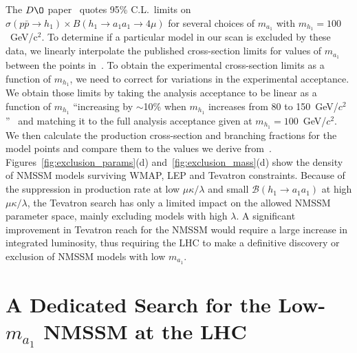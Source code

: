 \documentclass[aps,prl,twocolumn,nofootinbib,superscriptaddress]{revtex4}
\begin{document}
The $D\O$ paper~\cite{d0-low-ma} quotes 95\% C.L.\ limits on
$\sigma(p\bar{p} \to h_1) \times B(h_1 \to a_1 a_1 \to 4\mu)$ for
several choices of $m_{a_1}$ with $m_{h_1} = 100$~GeV/c$^2$.  To
determine if a particular model in our scan is excluded by these data,
we linearly interpolate the published cross-section limits for values
of $m_{a_1}$ between the points in~\cite{d0-low-ma}.  To obtain the
experimental cross-section limits as a function of $m_{h_1}$, we need
to correct for variations in the experimental acceptance.  We obtain
those limits by taking the analysis acceptance to be linear as a
function of $m_{h_1}$ ``increasing by $\sim$10\% when $m_{h_1}$
increases from 80 to 150~GeV/$c^2$''~\cite{d0-low-ma} and matching it
to the full analysis acceptance given at $m_{h_1} = 100$~GeV/$c^2$.
We then calculate the production cross-section and branching fractions
for the model points and compare them to the values we derive
from~\cite{d0-low-ma}.  Figures~\ref{fig:exclusion_params}(d)
and~\ref{fig:exclusion_mass}(d) show the density of NMSSM models
surviving WMAP, LEP and Tevatron constraints.  Because of the
suppression in production rate at low $\mu\kappa/\lambda$ and small
$\mathcal{B}(h_1 \to a_1 a_1)$ at high $\mu\kappa/\lambda$, the
Tevatron search has only a limited impact on the allowed NMSSM
parameter space, mainly excluding models with high $\lambda$.  A
significant improvement in Tevatron reach for the NMSSM would require
a large increase in integrated luminosity, thus requiring the LHC to
make a definitive discovery or exclusion of NMSSM models with low
$m_{a_1}$.

\section{A Dedicated Search for the Low-$m_{a_1}$ NMSSM at the LHC}
\end{document}

